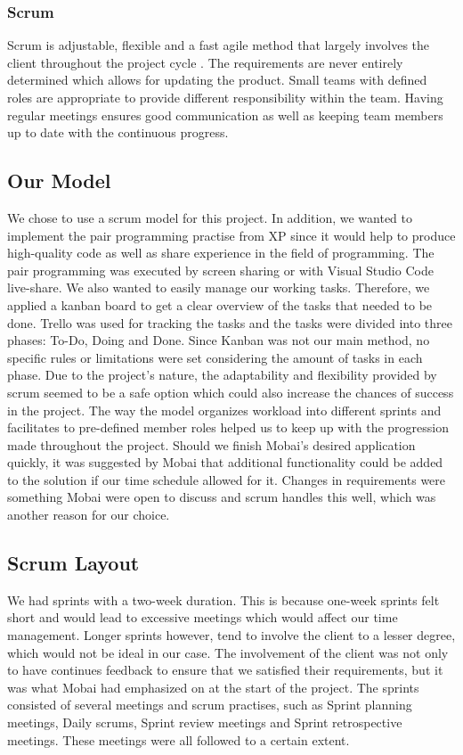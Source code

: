 \subsubsection*{Scrum}
Scrum is adjustable, flexible and a fast agile method that largely involves the client throughout the project cycle \cite{ScrumDefinition}. The requirements are never entirely determined which allows for updating the product. Small teams with defined roles are appropriate to provide different responsibility within the team. Having regular meetings ensures good communication as well as keeping team members up to date with the continuous progress.    

\subsection{Our Model}
\label{sec:OurModel}
We chose to use a scrum model for this project. In addition, we wanted to implement the pair programming practise from XP since it would help to produce high-quality code as well as share experience in the field of programming. The pair programming was executed by screen sharing or with Visual Studio Code live-share. We also wanted to easily manage our working tasks. Therefore, we applied a kanban board to get a clear overview of the tasks that needed to be done. Trello \cite{Trello} was used for tracking the tasks and the tasks were divided into three phases: To-Do, Doing and Done. Since Kanban was not our main method, no specific rules or limitations were set considering the amount of tasks in each phase. Due to the project's nature, the adaptability and flexibility provided by scrum seemed to be a safe option which could also increase the chances of success in the project. The way the model organizes workload into different sprints and facilitates to pre-defined member roles helped us to keep up with the progression made throughout the project. Should we finish Mobai's desired application quickly, it was suggested by Mobai that additional functionality could be added to the solution if our time schedule allowed for it. Changes in requirements were something Mobai were open to discuss and scrum handles this well, which was another reason for our choice. 

\subsection{Scrum Layout}
We had sprints with a two-week duration. This is because one-week sprints felt short and would lead to excessive meetings which would affect our time management. Longer sprints however, tend to involve the client to a lesser degree, which would not be ideal in our case. The involvement of the client was not only to have continues feedback to ensure that we satisfied their requirements, but it was what Mobai had emphasized on at the start of the project. The sprints consisted of several meetings and scrum practises, such as Sprint planning meetings, Daily scrums, Sprint review meetings and Sprint retrospective meetings. These meetings were all followed to a certain extent. 

